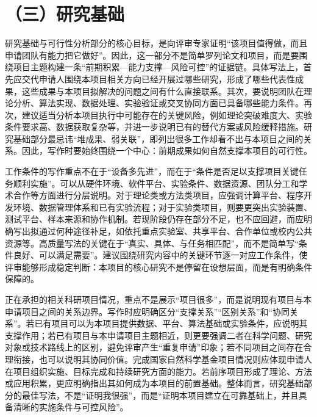 \documentclass[12pt,UTF8,AutoFakeBold=2,a4paper]{ctexart}
\begin{document}
	\section{（三）研究基础}
	
	\NSFCFoundationOne
	
	研究基础与可行性分析部分的核心目标，是向评审专家证明“该项目值得做，而且申请团队有能力把它做好”。因此，这一部分不是简单罗列论文和项目，而是要围绕项目主题构建一条“前期积累—能力支撑—风险可控”的证据链。具体写法上，首先应交代申请人围绕本项目相关方向已经开展过哪些研究，形成了哪些代表性成果，这些成果与本项目拟解决的问题之间有什么直接联系。其次，要说明团队在理论分析、算法实现、数据处理、实验验证或交叉协同方面已具备哪些能力条件。再次，建议适当分析本项目执行中可能存在的关键风险，例如理论突破难度大、实验条件要求高、数据获取复杂等，并进一步说明已有的替代方案或风险缓释措施。研究基础部分最忌讳“堆成果、弱关联”，即列出很多工作却看不出与本项目之间的关系。因此，写作时要始终围绕一个中心：前期成果如何自然支撑本项目的可行性\cite{Bollen2014,Gallo2020}。
	
	\NSFCFoundationTwo
	
	工作条件的写作重点不在于“设备多先进”，而在于“条件是否足以支撑项目关键任务顺利实施”。可以从硬件环境、软件平台、实验条件、数据资源、团队分工和学术合作等方面进行分层说明。对于理论类或方法类项目，应强调计算平台、程序开发环境、数据管理体系和已有实验流程；对于实验类项目，则要更突出实验装置、测试平台、样本来源和协作机制。若现阶段仍存在部分不足，也不应回避，而应明确写出拟通过何种途径补足，如依托重点实验室、共享平台、合作单位或校内公共资源等。高质量写法的关键在于“真实、具体、与任务相匹配”，而不是简单写“条件良好、可以满足需要”。建议围绕研究内容中的关键环节逐一对应工作条件，使评审能够形成稳定判断：本项目的核心研究不是停留在设想层面，而是有明确条件保障的\cite{Fortin2014,Lee2022}。
	
	\NSFCFoundationThree
	
	正在承担的相关科研项目情况，重点不是展示“项目很多”，而是说明现有项目与本申请项目之间的关系边界。写作时应明确区分“支撑关系”“区别关系”和“协同关系”。若已有项目可以为本项目提供数据、平台、算法基础或实验条件，应说明其支撑作用；若已有项目与本申请项目主题相近，则更要强调二者在科学问题、研究对象或技术路线上的区别，避免评审产生“重复申请”印象；若不同项目之间存在合理衔接，也可以说明其协同价值。完成国家自然科学基金项目情况则应体现申请人在项目组织实施、目标完成和持续研究方面的能力。若前序项目形成了理论、方法或应用积累，更应明确指出其如何成为本项目的前置基础。整体而言，研究基础部分的最佳写法，不是“证明我很强”，而是“证明本项目建立在可靠基础上，并且具备清晰的实施条件与可控风险”\cite{Herbert2013,Mervis2016}。
	
\end{document}

